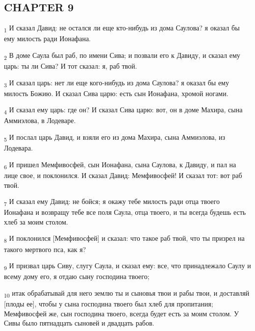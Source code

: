 \subsection{CHAPTER 9}
\begin{tcolorbox}
\textsubscript{1} И сказал Давид: не остался ли еще кто-нибудь из дома Саулова? я оказал бы ему милость ради Ионафана.
\end{tcolorbox}
\begin{tcolorbox}
\textsubscript{2} В доме Саула был раб, по имени Сива; и позвали его к Давиду, и сказал ему царь: ты ли Сива? И тот сказал: я, раб твой.
\end{tcolorbox}
\begin{tcolorbox}
\textsubscript{3} И сказал царь: нет ли еще кого-нибудь из дома Саулова? я оказал бы ему милость Божию. И сказал Сива царю: есть сын Ионафана, хромой ногами.
\end{tcolorbox}
\begin{tcolorbox}
\textsubscript{4} И сказал ему царь: где он? И сказал Сива царю: вот, он в доме Махира, сына Аммиэлова, в Лодеваре.
\end{tcolorbox}
\begin{tcolorbox}
\textsubscript{5} И послал царь Давид, и взяли его из дома Махира, сына Аммиэлова, из Лодевара.
\end{tcolorbox}
\begin{tcolorbox}
\textsubscript{6} И пришел Мемфивосфей, сын Ионафана, сына Саулова, к Давиду, и пал на лице свое, и поклонился. И сказал Давид: Мемфивосфей! И сказал тот: вот раб твой.
\end{tcolorbox}
\begin{tcolorbox}
\textsubscript{7} И сказал ему Давид: не бойся; я окажу тебе милость ради отца твоего Ионафана и возвращу тебе все поля Саула, отца твоего, и ты всегда будешь есть хлеб за моим столом.
\end{tcolorbox}
\begin{tcolorbox}
\textsubscript{8} И поклонился [Мемфивосфей] и сказал: что такое раб твой, что ты призрел на такого мертвого пса, как я?
\end{tcolorbox}
\begin{tcolorbox}
\textsubscript{9} И призвал царь Сиву, слугу Саула, и сказал ему: все, что принадлежало Саулу и всему дому его, я отдаю сыну господина твоего;
\end{tcolorbox}
\begin{tcolorbox}
\textsubscript{10} итак обрабатывай для него землю ты и сыновья твои и рабы твои, и доставляй [плоды ее], чтобы у сына господина твоего был хлеб для пропитания; Мемфивосфей же, сын господина твоего, всегда будет есть за моим столом. У Сивы было пятнадцать сыновей и двадцать рабов.
\end{tcolorbox}
